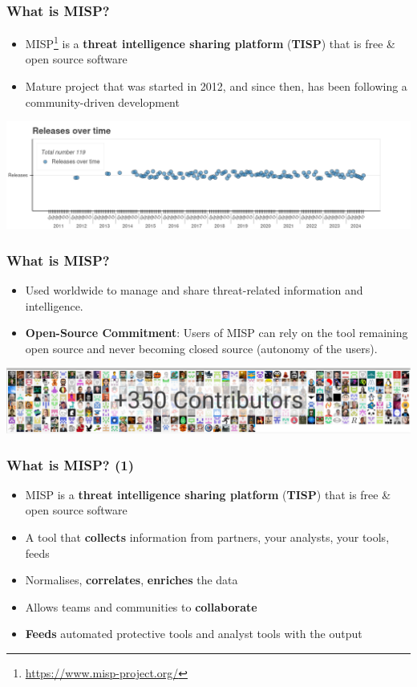 \begin{frame}
    \frametitle{What is MISP?}
    \begin{itemize}
        \item MISP\footnote{\url{https://www.misp-project.org/}} is a {\bf threat intelligence sharing platform} ({\bf TISP}) that is free \& open source software
        \item Mature project that was started in 2012, and since then, has been following a community-driven development
    \end{itemize}

    \begin{center}
        \includegraphics[width=0.99\linewidth]{release_overtime.png}
    \end{center}
\end{frame}

\begin{frame}
    \frametitle{What is MISP?}
    \begin{itemize}
        \item Used worldwide to manage and share threat-related information and intelligence.
	\item \textbf{Open-Source Commitment}: Users of MISP can rely on the tool remaining open source and never becoming closed source (autonomy of the users).
    \end{itemize}

    \begin{center}
        \includegraphics[width=0.99\linewidth]{contributors.png}
    \end{center}
\end{frame}


\begin{frame}
    \frametitle{What is MISP? (1)}
    \begin{itemize}
        \item MISP is a {\bf threat intelligence sharing platform} ({\bf TISP}) that is free \& open source software
        \item A tool that {\bf collects} information from partners, your analysts, your tools, feeds
        \item Normalises, {\bf correlates}, {\bf enriches} the data
        \item Allows teams and communities to {\bf collaborate}
        \item {\bf Feeds} automated protective tools and analyst tools with the output
    \end{itemize}
\end{frame}

